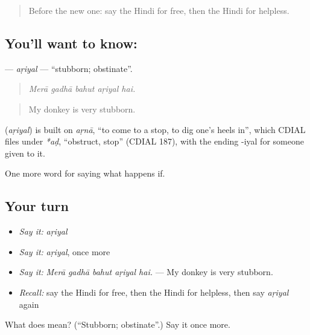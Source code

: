 \begin{quote}
Before the new one: say the Hindi for free, then the Hindi for helpless.
\end{quote}

\subsection*{You'll want to know: }
\textbf{} — \emph{aṛiyal} — \textquotedblleft{}stubborn; obstinate\textquotedblright{}.

\begin{quote}
    
\end{quote}

\begin{quote}
\emph{Merā gadhā bahut aṛiyal hai.}
\end{quote}

\begin{quote}
My donkey is very stubborn.
\end{quote}

\begin{cousinweb}
\textbf{} (\emph{aṛiyal}) is built on \emph{aṛnā}, \textquotedblleft{}to come to a stop, to dig one's heels in\textquotedblright{}, which CDIAL files under \emph{*aḍ}, \textquotedblleft{}obstruct, stop\textquotedblright{} (CDIAL 187), with the ending -iyal for someone given to it.
\end{cousinweb}

\begin{grammarlens}[title={What you've built}]
One more word for saying what happens if.
\end{grammarlens}

\subsection*{Your turn}
\begin{itemize}
\raggedright
  \item \emph{Say it:} \emph{aṛiyal}
  \item \emph{Say it:} \emph{aṛiyal}, once more
  \item \emph{Say it:} \emph{Merā gadhā bahut aṛiyal hai.} — My donkey is very stubborn.
  \item \emph{Recall:} say the Hindi for free, then the Hindi for helpless, then say \emph{aṛiyal} again
\end{itemize}

\begin{tcolorbox}[breakable,colback=teal!4,colframe=teal!35!black,title={Before you move on}]
What does  mean? (\textquotedblleft{}Stubborn; obstinate\textquotedblright{}.) Say it once more.
\end{tcolorbox}
